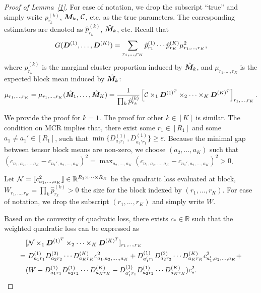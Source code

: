 \documentclass{article}
\begin{document}
\begin{appendices}
\begin{proof}[Proof of Lemma~\ref{1}]
For ease of notation, we drop the subscript ``true'' and simply write $p^{(k)}_{r_k}$, $\bm M_k$, $\mathcal{C}$, etc. as the true parameters. The corresponding estimators are denoted as $\hat p^{(k)}_{r_k}$, $\hat {\bm M}_k$, etc.
Recall that 
\begin{equation}\label{eq:D}
G(\bm{D}^{(1)},\ldots,\bm{D}^{(K)})=\sum_{r_1,\ldots,r_K} \hat p^{(1)}_{r_1}\cdots \hat p^{(K)}_{r_K}  \mu^2_{r_1,\ldots,r_K},
\end{equation}
where  $\hat p^{(k)}_{r_k}$ is the marginal cluster proportion induced by $\hat{\bm M}_k$, and $\mu_{r_1,\ldots,r_K}$ is the expected block mean induced by $\hat{\bm M}_k$:
\[
\mu_{r_1,\ldots,r_K}=\mu_{r_1,\ldots,r_K}(\hat{\bm M}_1,\ldots,\hat{\bm M}_K)={1\over \prod_k \hat p^{(k)}_{r_k}}\left[ \mathcal{C}\times_1 \bm{D}^{(1)^T} \times_2\cdots\times_K \bm{D}^{(K)^T}\right]_{r_1,\ldots,r_K}.
\]


We provide the proof for $k=1$. The proof for other $k\in[K]$ is similar. The condition on MCR implies that, there exist some $r_1\in[R_1]$ and some $a_1\neq a_1'\in[R_1]$, such that $\min\{D_{a_1r_1}^{(1)}, D_{a_1'r_1}^{(1)}\}\geq \varepsilon$. Because the minimal gap between tensor block means are non-zero, we choose $(a_2,\ldots,a_K)$ such that $(c_{a_1,a_2,\ldots,a_K}-c_{a_1',a_2,\ldots,a_K})^2 = \displaystyle\max_{a_2,\ldots,a_K}(c_{a_1,a_2,\ldots,a_K}-c_{a_1',a_2,\ldots,a_K})^2>0$. 

Let $\mathcal{N}=\llbracket c^2_{a_1,\ldots,a_K} \rrbracket\in \mathbb{R}^{R_1\times\cdots\times R_K}$ be the quadratic loss evaluated at block, $W_{r_1,\ldots,r_K} = \prod_k \hat p^{(k)}_{r_k} >0$ the size for the block indexed by $(r_1,\ldots,r_K)$. For ease of notation, we drop the subscript ${(r_1,\ldots,r_K)}$ and simply write $W$.

Based on the convexity of quadratic loss, there exists $c_*\in\mathbb{R}$ such that the weighted quadratic loss can be expressed as
\begin{align}
&[\mathcal{N}\times_1\bm{D}^{(1)^T}\times_2\cdots\times_K \bm{D}^{(K)^T}]_{r_1,\ldots,r_K}\\
=&\ D_{a_1r_1}^{(1)}D_{a_2r_2}^{(2)} \cdots D_{a_Kr_K}^{(K)}c^2_{a_1,a_2,\ldots.,a_K}+D_{a_1'r_1}^{(1)}D_{a_2r_2}^{(2)} \cdots D_{a_Kr_K}^{(K)}c^2_{a_1',a_2,\ldots,a_K}+\\
&(W-D_{a_1r_1}^{(1)}D_{a_2r_2}^{(1)}\cdots D_{a_Kr_K}^{(K)}-D_{a_1'r_1}^{(1)}D_{a_2r_2}^{(1)}\cdots D_{a_Kr_K}^{(K)})c^2_*.
\end{align}


\end{proof}
\end{appendices}
\end{document}

